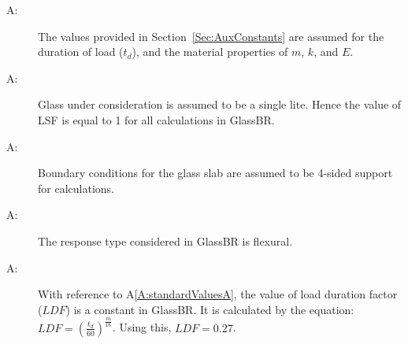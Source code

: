 \documentclass[12pt]{article}
\newcounter{assumpnum}
\newcommand{\atheassumpnum}{A\theassumpnum}
\begin{document}
\begin{description}
\item[\atheassumpnum\label{A:standardValuesA}:]The values provided in Section~\ref{Sec:AuxConstants} are assumed for the duration of load (${t_{d}}$), and the material properties of $m$, $k$, and $E$.
\end{description}
\begin{description}
\item[\atheassumpnum\label{A:glassLiteA}:]Glass under consideration is assumed to be a single lite. Hence the value of LSF is equal to 1 for all calculations in GlassBR.
\end{description}
\begin{description}
\item[\atheassumpnum\label{A:bndryConditionsA}:]Boundary conditions for the glass slab are assumed to be 4-sided support for calculations.
\end{description}
\begin{description}
\item[\atheassumpnum\label{A:responseTyA}:]The response type considered in GlassBR is flexural.
\end{description}
\begin{description}
\item[\atheassumpnum\label{A:ldfConstantA}:]With reference to A\ref{A:standardValuesA}, the value of load duration factor ($LDF$) is a constant in GlassBR. It is calculated by the equation: $LDF=\left(\frac{{t_{d}}}{60}\right)^{\frac{m}{16}}$. Using this, $LDF=0.27$.
\end{description}
\end{document}
